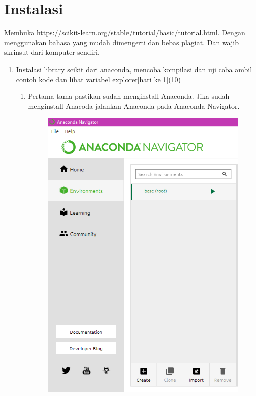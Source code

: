 \section{Instalasi}
Membuka https://scikit-learn.org/stable/tutorial/basic/tutorial.html. Dengan menggunakan bahasa yang mudah dimengerti dan bebas plagiat. 
Dan wajib skrinsut dari komputer sendiri.
\begin{enumerate}
\item
Instalasi library scikit dari anaconda, mencoba kompilasi dan uji coba ambil contoh kode dan lihat variabel explorer[hari ke 1](10)
\begin{enumerate}
\item Pertama-tama pastikan sudah menginstall Anaconda. Jika sudah menginstall Anacoda jalankan Anaconda pada Anaconda Navigator.
\begin{figure}[H]
	\includegraphics[width=1\textwidth]{figures/1184065/InstallLibraryScikit.png}

\end{figure}
\end{enumerate}
\end{enumerate}
